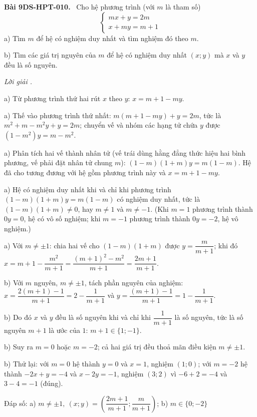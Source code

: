 \documentclass[12pt,a4paper]{article}
\newenvironment{problem}[1][]{\par\medskip\noindent\textbf{Bài #1.}\ }{\par}
\newenvironment{solution}[1][]{\par\noindent\textit{Lời giải #1.}\par}{\par}
\begin{document}
\begin{problem}[9DS-HPT-010]
Cho hệ phương trình (với $m$ là tham số)
\[ \begin{cases} mx + y = 2m \\ x + my = m + 1 \end{cases} \]
a) Tìm $m$ để hệ có nghiệm duy nhất và tìm nghiệm đó theo $m$.

b) Tìm các giá trị nguyên của $m$ để hệ có nghiệm duy nhất $(x; y)$ mà $x$ và $y$ đều là số nguyên.

\begin{solution}
a) Từ phương trình thứ hai rút $x$ theo $y$: $x = m + 1 - my$.

a) Thế vào phương trình thứ nhất: $m(m + 1 - my) + y = 2m$, tức là $m^2 + m - m^2y + y = 2m$; chuyển vế và nhóm các hạng tử chứa $y$ được $(1 - m^2)y = m - m^2$.

a) Phân tích hai vế thành nhân tử (vế trái dùng hằng đẳng thức hiệu hai bình phương, vế phải đặt nhân tử chung $m$): $(1 - m)(1 + m)y = m(1 - m)$. Hệ đã cho tương đương với hệ gồm phương trình này và $x = m + 1 - my$.

a) Hệ có nghiệm duy nhất khi và chỉ khi phương trình $(1 - m)(1 + m)y = m(1 - m)$ có nghiệm duy nhất, tức là $(1 - m)(1 + m) \neq 0$, hay $m \neq 1$ và $m \neq -1$. (Khi $m = 1$ phương trình thành $0y = 0$, hệ có vô số nghiệm; khi $m = -1$ phương trình thành $0y = -2$, hệ vô nghiệm.)

a) Với $m \neq \pm 1$: chia hai vế cho $(1 - m)(1 + m)$ được $y = \dfrac{m}{m + 1}$; khi đó $x = m + 1 - \dfrac{m^2}{m + 1} = \dfrac{(m + 1)^2 - m^2}{m + 1} = \dfrac{2m + 1}{m + 1}$.

b) Với $m$ nguyên, $m \neq \pm 1$, tách phần nguyên của nghiệm: $x = \dfrac{2(m + 1) - 1}{m + 1} = 2 - \dfrac{1}{m + 1}$ và $y = \dfrac{(m + 1) - 1}{m + 1} = 1 - \dfrac{1}{m + 1}$.

b) Do đó $x$ và $y$ đều là số nguyên khi và chỉ khi $\dfrac{1}{m + 1}$ là số nguyên, tức là số nguyên $m + 1$ là ước của $1$: $m + 1 \in \{1; -1\}$.

b) Suy ra $m = 0$ hoặc $m = -2$; cả hai giá trị đều thoả mãn điều kiện $m \neq \pm 1$.

b) Thử lại: với $m = 0$ hệ thành $y = 0$ và $x = 1$, nghiệm $(1; 0)$; với $m = -2$ hệ thành $-2x + y = -4$ và $x - 2y = -1$, nghiệm $(3; 2)$ vì $-6 + 2 = -4$ và $3 - 4 = -1$ (đúng).

Đáp số: a) $\boxed{m \neq \pm 1,\ (x; y) = \left(\dfrac{2m + 1}{m + 1}; \dfrac{m}{m + 1}\right)}$; b) $\boxed{m \in \{0; -2\}}$
\end{solution}
\end{problem}
\end{document}
